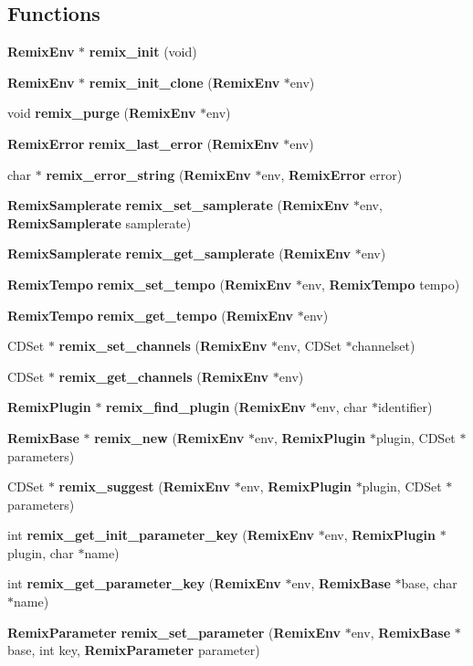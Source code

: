 \subsection*{Functions}
\begin{DoxyCompactItemize}
\item 
{\bf RemixEnv} $\ast$ {\bf remix\_\-init} (void)
\item 
{\bf RemixEnv} $\ast$ {\bf remix\_\-init\_\-clone} ({\bf RemixEnv} $\ast$env)
\item 
void {\bf remix\_\-purge} ({\bf RemixEnv} $\ast$env)
\item 
{\bf RemixError} {\bf remix\_\-last\_\-error} ({\bf RemixEnv} $\ast$env)
\item 
char $\ast$ {\bf remix\_\-error\_\-string} ({\bf RemixEnv} $\ast$env, {\bf RemixError} error)
\item 
{\bf RemixSamplerate} {\bf remix\_\-set\_\-samplerate} ({\bf RemixEnv} $\ast$env, {\bf RemixSamplerate} samplerate)
\item 
{\bf RemixSamplerate} {\bf remix\_\-get\_\-samplerate} ({\bf RemixEnv} $\ast$env)
\item 
{\bf RemixTempo} {\bf remix\_\-set\_\-tempo} ({\bf RemixEnv} $\ast$env, {\bf RemixTempo} tempo)
\item 
{\bf RemixTempo} {\bf remix\_\-get\_\-tempo} ({\bf RemixEnv} $\ast$env)
\item 
CDSet $\ast$ {\bf remix\_\-set\_\-channels} ({\bf RemixEnv} $\ast$env, CDSet $\ast$channelset)
\item 
CDSet $\ast$ {\bf remix\_\-get\_\-channels} ({\bf RemixEnv} $\ast$env)
\item 
{\bf RemixPlugin} $\ast$ {\bf remix\_\-find\_\-plugin} ({\bf RemixEnv} $\ast$env, char $\ast$identifier)
\item 
{\bf RemixBase} $\ast$ {\bf remix\_\-new} ({\bf RemixEnv} $\ast$env, {\bf RemixPlugin} $\ast$plugin, CDSet $\ast$parameters)
\item 
CDSet $\ast$ {\bf remix\_\-suggest} ({\bf RemixEnv} $\ast$env, {\bf RemixPlugin} $\ast$plugin, CDSet $\ast$parameters)
\item 
int {\bf remix\_\-get\_\-init\_\-parameter\_\-key} ({\bf RemixEnv} $\ast$env, {\bf RemixPlugin} $\ast$plugin, char $\ast$name)
\item 
int {\bf remix\_\-get\_\-parameter\_\-key} ({\bf RemixEnv} $\ast$env, {\bf RemixBase} $\ast$base, char $\ast$name)
\item 
{\bf RemixParameter} {\bf remix\_\-set\_\-parameter} ({\bf RemixEnv} $\ast$env, {\bf RemixBase} $\ast$base, int key, {\bf RemixParameter} parameter)

\end{DoxyCompactItemize}

